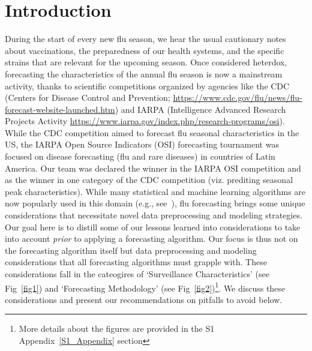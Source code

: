 \documentclass[10pt,letterpaper]{article}
\newcommand{\narenc}[1]{{\color{black}\textrm{#1}}}
\begin{document}
\section*{Introduction}
\narenc{During the start of every new flu season, we hear the usual cautionary
notes about vaccinations, the preparedness of our health systems, and the
specific strains that are relevant for the upcoming season. Once considered
heterdox, forecasting the characteristics of the annual flu season is now a
mainstream activity, thanks to scientific competitions organized by agencies
like the CDC (Centers for Disease Control and Prevention;
\url{https://www.cdc.gov/flu/news/flu-forecast-website-launched.htm}) and IARPA
(Intelligence Advanced Research Projects Activity
\url{https://www.iarpa.gov/index.php/research-programs/osi}).} While the CDC
competition aimed to forecast flu seasonal characteristics in the US, the IARPA
Open Source Indicators (OSI) forecasting tournament was focused on disease
forecasting (flu and rare diseases) in countries of Latin America.  Our team
was declared the winner in the IARPA OSI competition and \narenc{as the winner
in one category of the CDC competition (viz.  prediting seasonal peak
characteristics).  While many statistical and machine learning algorithms are
now popularly used in this domain (e.g.,
see~\cite{chakraborty2014forecasting,shaman2013real,goldstein2011predicting}),
flu forecasting brings some unique considerations that necessitate novel data
preprocessing and modeling strategies.  Our goal here is to distill some of our
lessons learned into considerations to take into account {\it prior} to
applying a forecasting algorithm. Our focus is thus not on the forecasting
algorithm itself but data preprocessing and modeling considerations that all
forecasting algorithms must grapple with. These considerations fall in the
cateogires of `Surveillance Characteristics' (see Fig~\ref{fig1}) and
`Forecasting Methodology' (see Fig~\ref{fig2})\footnote{More details about the figures 
are provided in the S1 Appendix~\ref{S1_Appendix} section}. We discuss these considerations
and present our recommendations on pitfalls to avoid below.}

\end{document}
